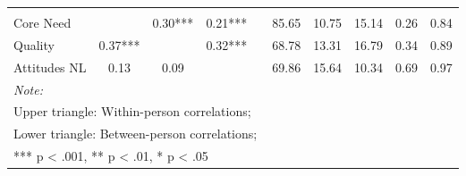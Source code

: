 \begin{table}
\begin{minipage}[t][\textheight][t]{\textwidth}
{\begin{tabular}[t]{lccccccccc}
\addlinespace[0.3em]
\multicolumn{10}{l}{\textbf{Across Studies}}\\
\hspace{1em}Core Need &  & 0.30*** & 0.21*** &  & 85.65 & 10.75 & 15.14 & 0.26 & 0.84\\
\hspace{1em}Quality & 0.37*** &  & 0.32*** &  & 68.78 & 13.31 & 16.79 & 0.34 & 0.89\\
\hspace{1em}Attitudes NL & 0.13 & 0.09 &  &  & 69.86 & 15.64 & 10.34 & 0.69 & 0.97\\
\bottomrule
\multicolumn{10}{l}{\rule{0pt}{1em}\textit{Note: }}\\
\multicolumn{10}{l}{\rule{0pt}{1em}Upper triangle: Within-person correlations;}\\
\multicolumn{10}{l}{\rule{0pt}{1em}Lower triangle: Between-person correlations;}\\
\multicolumn{10}{l}{\rule{0pt}{1em}*** p < .001, ** p < .01,  * p < .05}\\
\end{tabular}}
\end{minipage}
\end{table}
